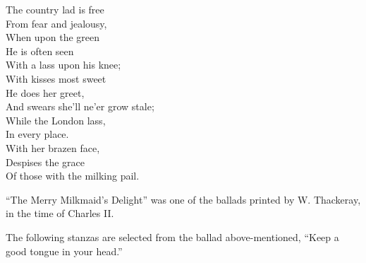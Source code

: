 \begin{dcverse}
\begin{patverse}
The country lad is free\\
From fear and jealousy,\\
When upon the green\\
He is often seen\\
With a lass upon his knee;\\
With kisses most sweet\\
He does her greet,\\
And swears she'll ne’er grow stale;\\
While the London lass,\\
In every place.\\
With her brazen face,\\
Despises the grace\\
Of those with the milking pail.
\end{patverse}
\end{dcverse}

“The Merry Milkmaid’s Delight” was one of the ballads printed by
W. Thackeray, in the time of Charles II.

The following stanzas are selected from the ballad above-mentioned, “Keep
a good tongue in your head.”
\pagebreak



